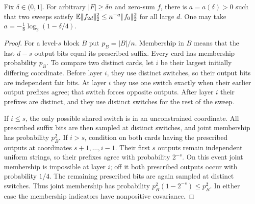 \begin{proposition}
\label{cycles:negative-prop}
Fix $\delta\in(0,1]$. For arbitrary $|F|\ge\delta n$ and zero-sum $f$,
there is $a=a(\delta)>0$ such that two sweeps satisfy
$\mathbb E\|f_{2d}\|_2^2\le n^{-a}\|f_0\|_2^2$ for all large $d$.
One may take $a=-\frac18\log_2(1-\delta/4)$.
\end{proposition}
\begin{proof}
For a level-$s$ block $B$ put $p_B=|B|/n$. Membership in $B$
means that the last $d-s$ output bits equal its prescribed suffix.
Every card has membership probability $p_B$. To compare two distinct
cards, let $i$ be their largest initially differing coordinate. Before
layer $i$, they use distinct switches, so their output bits are
independent fair bits. At layer $i$ they use one switch exactly when
their earlier output prefixes agree; that switch forces opposite
outputs. After layer $i$ their prefixes are distinct, and they use
distinct switches for the rest of the sweep.

If $i\le s$, the only possible shared switch is in an unconstrained
coordinate. All prescribed suffix bits are then sampled at distinct
switches, and joint membership has probability $p_B^2$. If $i>s$,
condition on both cards having the prescribed outputs at coordinates
$s+1,\ldots,i-1$. Their first $s$ outputs remain independent uniform
strings, so their prefixes agree with probability $2^{-s}$. On this
event joint membership is impossible at layer $i$; off it both
prescribed outputs occur with probability $1/4$. The remaining
prescribed bits are again sampled at distinct switches. Thus joint
membership has probability $p_B^2(1-2^{-s})\le p_B^2$.
In either case the membership indicators have nonpositive covariance.


\end{proof}
